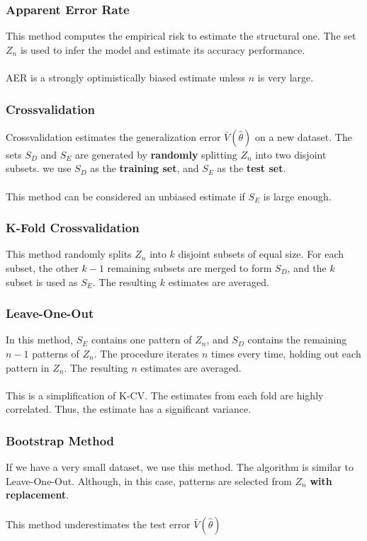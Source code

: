\documentclass{article}
\begin{document}
\subsubsection{Apparent Error Rate}
This method computes the empirical risk to estimate the structural one. The set $Z_n$ is used to infer the model and estimate its accuracy performance. \\ \\
AER is a strongly optimistically biased estimate unless $n$ is very large.

\subsubsection{Crossvalidation}
Crossvalidation estimates the generalization error $\bar V(\hat\theta)$ on a new dataset. The sets $S_D$ and $S_E$ are generated by \textbf{randomly} splitting $Z_n$ into two disjoint subsets. we use $S_D$ as the \textbf{training set}, and $S_E$ as the \textbf{test set}. \\ \\
This method can be considered an unbiased estimate if $S_E$ is large enough.

\subsubsection{K-Fold Crossvalidation}
This method randomly splits $Z_n$ into $k$ disjoint subsets of equal size. For each subset, the other $k-1$ remaining subsets are merged to form $S_D$, and the $k$ subset is used as $S_E$. The resulting $k$ estimates are averaged.

\subsubsection{Leave-One-Out}
In this method, $S_E$ contains one pattern of $Z_n$, and $S_D$ contains the remaining $n - 1$ patterns of $Z_n$. The procedure iterates $n$ times every time, holding out each pattern in $Z_n$. The resulting $n$ estimates are averaged. \\ \\
This is a simplification of K-CV. The estimates from each fold are highly correlated. Thus, the estimate has a significant variance.

\subsubsection{Bootstrap Method}
If we have a very small dataset, we use this method. The algorithm is similar to Leave-One-Out. Although, in this case, patterns are selected from $Z_n$ \textbf{with replacement}. \\ \\
This method underestimates the test error $\bar V(\hat\theta)$
\end{document}
